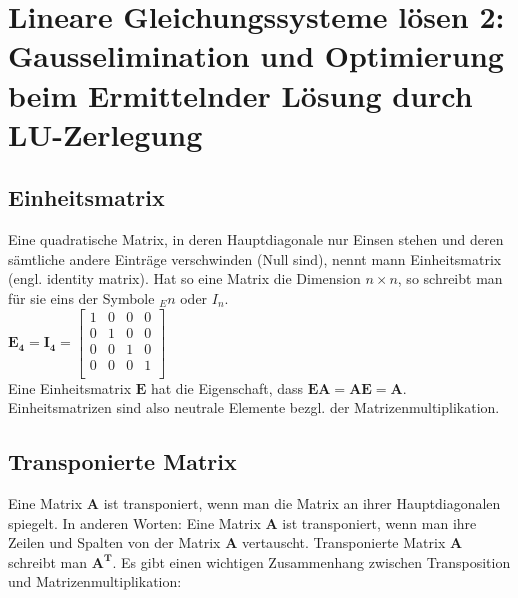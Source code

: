 \documentclass[../main.tex]{subfiles}
\begin{document}

\chapter{Lineare Gleichungssysteme lösen 2: Gausselimination und Optimierung beim Ermittelnder Lösung durch LU-Zerlegung}

\section{Einheitsmatrix}
Eine quadratische Matrix, in deren Hauptdiagonale nur Einsen stehen und deren sämtliche
andere Einträge verschwinden (Null sind), nennt mann Einheitsmatrix (engl. identity matrix).
Hat so eine Matrix die Dimension $n\times n$, so schreibt man für sie eins der Symbole $_En$ oder $I_n$. \\ [7pt]

$\mathbf{E_4}=\mathbf{I_4}=
\begin{bmatrix}
    1 & 0 & 0 & 0 \\
    0 & 1 & 0 & 0 \\
    0 & 0 & 1 & 0 \\
    0 & 0 & 0 & 1 \\
\end{bmatrix}$ \\ [7pt]
Eine Einheitsmatrix $\mathbf{E}$ hat die Eigenschaft, dass $\mathbf{EA}=\mathbf{AE}=\mathbf{A}$.
Einheitsmatrizen sind also neutrale Elemente bezgl. der Matrizenmultiplikation.

\section{Transponierte Matrix}
Eine Matrix $\mathbf{A}$ ist transponiert, wenn man die Matrix an ihrer Hauptdiagonalen spiegelt.
In anderen Worten: Eine Matrix $\mathbf{A}$ ist transponiert, wenn man ihre Zeilen und Spalten von der 
Matrix $\mathbf{A}$ vertauscht. Transponierte Matrix $\mathbf{A}$ schreibt man $\mathbf{A^T}$. 
Es gibt einen wichtigen Zusammenhang zwischen Transposition und Matrizenmultiplikation: \\ [7pt]
\end{document}

